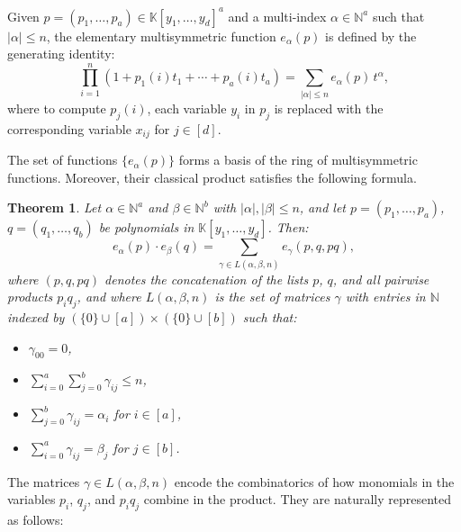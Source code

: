 \documentclass[11pt]{article}
\newtheorem{thm}{Theorem}%
\begin{document}
Given $p = (p_1, \ldots, p_a) \in \mathbb{K}[y_1,\ldots,y_d]^a$ and a multi-index $\alpha \in \mathbb{N}^a$ such that $|\alpha| \leq n$, the elementary multisymmetric function $e_{\alpha}(p)$ is defined by the generating identity:
\[
\prod_{i=1}^{n} \left(1 + p_1(i)t_1 + \cdots + p_a(i)t_a \right) 
= \sum_{|\alpha|\leq n} e_{\alpha}(p)\, t^\alpha,
\]
where to compute $ p_j(i)$, each variable $ y_i $ in $p_j $ is replaced with the corresponding variable $ x_{ij}$ for  $j\in[d]$.

The set of functions $\{e_\alpha(p)\}$ forms a basis of the ring of multisymmetric functions. Moreover, their classical product satisfies the following formula.

\begin{thm}\label{classicalProductVaccarino}
Let $\alpha \in \mathbb{N}^a$ and $\beta \in\mathbb{N}^b$ with $|\alpha|, |\beta| \leq n$, and let $p = (p_1,\ldots,p_a)$, $q = (q_1,\ldots,q_b)$ be polynomials in $\mathbb{K}[y_1,\ldots,y_d]$. Then:
\[
e_{\alpha}(p) \cdot e_{\beta}(q) = \sum_{\gamma \in L(\alpha, \beta, n)} e_{\gamma}(p, q, pq),
\]
where $(p,q,pq)$ denotes the concatenation of the lists $p$, $q$, and all pairwise products $p_i q_j$, and where $L(\alpha, \beta, n)$ is the set of matrices $\gamma$ with entries in $\mathbb{N}$ indexed by $(\{0\} \cup [a]) \times (\{0\} \cup [b])$ such that:
\begin{itemize}
    \item $\gamma_{00} = 0$,
    \item $\sum_{i=0}^a \sum_{j=0}^b \gamma_{ij} \leq n$,
    \item $\sum_{j=0}^b \gamma_{ij} = \alpha_i$ for $i \in [a]$,
    \item $\sum_{i=0}^a \gamma_{ij} = \beta_j$ for $j \in [b]$.
\end{itemize}
\end{thm}

The matrices $\gamma \in L(\alpha, \beta, n)$ encode the combinatorics of how monomials in the variables $p_i$, $q_j$, and $p_i q_j$ combine in the product. They are naturally represented as follows:
\end{document}
